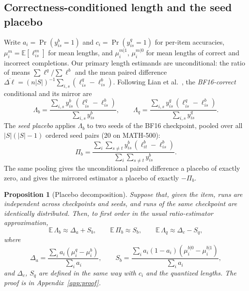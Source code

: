 \documentclass[11pt,a4paper]{article}
\newtheorem{proposition}{Proposition}
\begin{document}
\subsection{Correctness-conditioned length and the seed placebo}
\label{sec:placebo-def}
Write $a_i=\Pr(y^b_{is}=1)$ and $c_i=\Pr(y^q_{is}=1)$ for per-item accuracies, $\mu^m_i=\mathbb{E}[\ell^m_{is}]$ for mean lengths, and $\mu^{m|1}_i$, $\mu^{m|0}_i$ for mean lengths of correct and incorrect completions. Our primary length estimands are unconditional: the ratio of means $\sum\ell^q/\sum\ell^b$ and the mean paired difference $\overline{\Delta\ell}=(n|S|)^{-1}\sum_{i,s}(\ell^q_{is}-\ell^b_{is})$. Following Lian et al.~\cite{lian2026quantinflates}, the \emph{BF16-correct} conditional and its mirror are
\begin{equation}
\Lambda_b=\frac{\sum_{i,s} y^b_{is}\,(\ell^q_{is}-\ell^b_{is})}{\sum_{i,s} y^b_{is}},\qquad
\Lambda_q=\frac{\sum_{i,s} y^q_{is}\,(\ell^q_{is}-\ell^b_{is})}{\sum_{i,s} y^q_{is}}.
\end{equation}
The \emph{seed placebo} applies $\Lambda_b$ to two seeds of the BF16 checkpoint, pooled over all $|S|(|S|-1)$ ordered seed pairs (20 on MATH-500):
\begin{equation}
\Pi_b=\frac{\sum_{i}\sum_{s\neq t} y^b_{is}\,(\ell^b_{it}-\ell^b_{is})}{\sum_{i}\sum_{s\neq t} y^b_{is}}.
\end{equation}
The same pooling gives the unconditional paired difference a placebo of exactly zero, and gives the mirrored estimator a placebo of exactly $-\Pi_b$.

\begin{proposition}[Placebo decomposition]
\label{prop:placebo}
Suppose that, given the item, runs are independent across checkpoints and seeds, and runs of the same checkpoint are identically distributed. Then, to first order in the usual ratio-estimator approximation,
\begin{equation}
\mathbb{E}\,\Lambda_b \approx \Delta_a + S_b,\qquad \mathbb{E}\,\Pi_b \approx S_b,\qquad \mathbb{E}\,\Lambda_q \approx \Delta_c - S_q,
\end{equation}
where
\begin{equation}
\Delta_a=\frac{\sum_i a_i(\mu^q_i-\mu^b_i)}{\sum_i a_i},\qquad
S_b=\frac{\sum_i a_i(1-a_i)(\mu^{b|0}_i-\mu^{b|1}_i)}{\sum_i a_i},
\end{equation}
and $\Delta_c$, $S_q$ are defined in the same way with $c_i$ and the quantized lengths. The proof is in Appendix~\ref{app:proof}.
\end{proposition}
\end{document}
